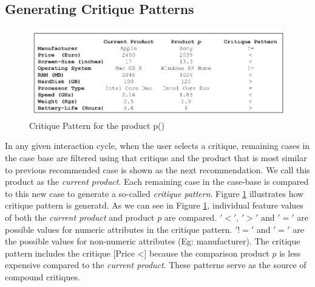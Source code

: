 \subsection{Generating Critique Patterns}
\begin{figure}
  \centering
    \includegraphics[width=1.0\textwidth]{figures-bharath/critiquePatterns.png}
  \caption{Critique Pattern for the product p(\cite{reilly04})}
\label{fig:critiquePatterns}
\end{figure}
In any given interaction cycle, when the user selects a critique, remaining cases in the case base are filtered using that critique and the product that is most similar to previous recommended case is shown as the next recommendation.
We call this product as the \textit{current product}.
Each remaining case in the case-base is compared to this new case to generate a so-called \textit{critique pattern}. Figure \ref{fig:critiquePatterns} illustrates how critique pattern is generatd.
As we can see in Figure \ref{fig:critiquePatterns}, individual feature values of both the \textit{current product} and product $p$ are compared.
\textbf{$'<'$}, \textbf{$'>'$} and \textbf{$'='$} are possible values for numeric attributes in the critique pattern.
$'!='$ and $'='$ are the possible values for non-numeric attributes (Eg: manufacturer).
The critique pattern includes the critique [Price \textless] because the comparison product $p$ is less expensive compared to the \textit{current product}.
These patterns serve as the source of compound critiques.


